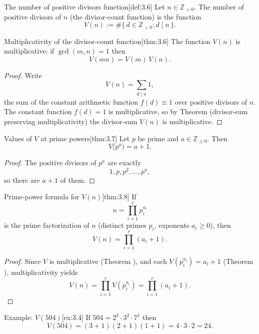 \documentclass[10pt]{article}
\theoremstyle{definition}
\theoremstyle{plain}
\numberwithin{equation}{section}
\begin{document}
\begin{define}{The number of positive divisors function}[def:3.6]
Let $n\in\mathbb{Z}_{>0}$. The number of positive divisors of $n$ (the divisor-count function) is the function
\[
V(n):=\#\{\,d\in\mathbb{Z}_{>0} : d\mid n\,\}.
\]
\end{define}

\begin{define}{Multiplicativity of the divisor-count function}[thm:3.6]
The function $V(n)$ is multiplicative: if $\gcd(m,n)=1$ then
\[
V(mn)=V(m)\,V(n).
\]
\end{define}

\begin{proof}
Write
\[
V(n)=\sum_{d\mid n} 1,
\]
the sum of the constant arithmetic function $f(d)\equiv 1$ over positive divisors of $n$. The constant function $f(d)=1$ is multiplicative, so by Theorem  (divisor-sum preserving multiplicativity) the divisor-sum $V(n)$ is multiplicative. 
\end{proof}

\begin{define}{Values of $V$ at prime powers}[thm:3.7]
Let $p$ be prime and $a\in\mathbb{Z}_{\ge 0}$. Then
\[
V\big(p^{a}\big)=a+1.
\]
\end{define}

\begin{proof}
The positive divisors of $p^a$ are exactly
\[
1,p,p^2,\dots,p^a,
\]
so there are $a+1$ of them.
\end{proof}

\begin{define}{Prime-power formula for $V(n)$}[thm:3.8]
If
\[
n=\prod_{i=1}^r p_i^{a_i}
\]
is the prime factorization of $n$ (distinct primes $p_i$, exponents $a_i\ge0$), then
\[
V(n)=\prod_{i=1}^r (a_i+1).
\]
\end{define}

\begin{proof}
Since $V$ is multiplicative (Theorem ), and each $V(p_i^{a_i})=a_i+1$ (Theorem ), multiplicativity yields
\[
V(n)=\prod_{i=1}^r V(p_i^{a_i})=\prod_{i=1}^r (a_i+1).
\]
\end{proof}

\begin{define}{Example: $V(504)$}[ex:3.4]
If $504=2^3\cdot 3^2\cdot 7^1$ then
\[
V(504)=(3+1)(2+1)(1+1)=4\cdot 3\cdot 2=24.
\]
\end{define}
\end{document}
